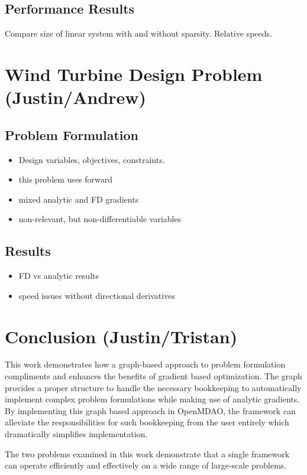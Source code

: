 \documentclass[]{aiaa-tc} %
\begin{document}
        \subsection{Performance Results}
            Compare size of linear system with and without sparsity. Relative speeds.


  \section{Wind Turbine Design Problem (Justin/Andrew)}
    \subsection{Problem Formulation}
        \begin{itemize}
            \item Design variables, objectives, constraints.
            \item this problem uses forward
            \item mixed analytic and FD gradients
            \item non-relevant, but non-differentiable variables
        \end{itemize}

    \subsection{Results}
        \begin{itemize}
            \item FD vs analytic results
            \item speed issues without directional derivatives
        \end{itemize}


  \section{Conclusion (Justin/Tristan)}

      This work demonstrates how a graph-based approach to problem formulation compliments and enhances the benefits of gradient based
      optimization. The graph provides a proper structure to handle the necessary bookkeeping to automatically implement complex
      problem formulations while making use of analytic gradients. By implementing this graph based approach in OpenMDAO, the framework
      can alleviate the responsibilities for such bookkeeping from the user entirely which dramatically simplifies implementation.

      The two problems examined in this work demonstrate that a single framework can operate efficiently and effectively on a wide range of large-scale problems.

  
\end{document}

